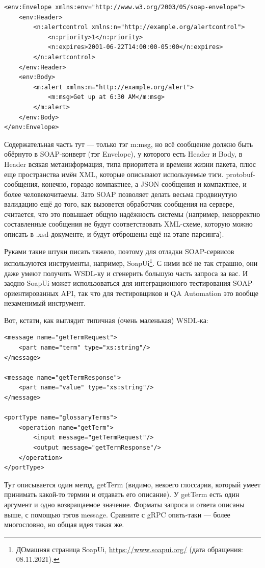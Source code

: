 \documentclass{../../text-style}
\begin{document}
\begin{verbatim}
<env:Envelope xmlns:env="http://www.w3.org/2003/05/soap-envelope">
    <env:Header>
        <n:alertcontrol xmlns:n="http://example.org/alertcontrol">
            <n:priority>1</n:priority>
            <n:expires>2001-06-22T14:00:00-05:00</n:expires>
        </n:alertcontrol>
    </env:Header>
    <env:Body>
        <m:alert xmlns:m="http://example.org/alert">
            <m:msg>Get up at 6:30 AM</m:msg>
        </m:alert>
    </env:Body>
</env:Envelope>
\end{verbatim}

Содержательная часть тут --- только тэг m:msg, но всё сообщение должно быть обёрнуто в SOAP-конверт (тэг Envelope), у которого есть Header и Body, в Header всякая метаинформация, типа приоритета и времени жизни пакета, плюс еще пространства имён XML, которые описывают используемые тэги. protobuf-сообщения, конечно, гораздо компактнее, а JSON сообщения и компактнее, и более человекочитаемы. Зато SOAP позволяет делать весьма продвинутую валидацию ещё до того, как вызовется обработчик сообщения на сервере, считается, что это повышает общую надёжность системы (например, некорректно составленные сообщения не будут соответствовать XML-схеме, которую можно описать в .xsd-документе, и будут отброшены ещё на этапе парсинга).

Руками такие штуки писать тяжело, поэтому для отладки SOAP-сервисов используются инструменты, например, SoapUi\footnote{ДОмашняя страница SoapUi, \url{https://www.soapui.org/} (дата обращения: 08.11.2021).}. С ними всё не так страшно, они даже умеют получить WSDL-ку и сгенерить большую часть запроса за вас. И заодно SoapUi может использоваться для интеграционного тестирования SOAP-ориентированных API, так что для тестировщиков и QA Automation это вообще незаменимый инструмент.

Вот, кстати, как выглядит типичная (очень маленькая) WSDL-ка:

\begin{verbatim}
<message name="getTermRequest">
    <part name="term" type="xs:string"/>
</message>

<message name="getTermResponse">
    <part name="value" type="xs:string"/>
</message>

<portType name="glossaryTerms">
    <operation name="getTerm">
        <input message="getTermRequest"/>
        <output message="getTermResponse"/>
    </operation>
</portType>
\end{verbatim}

Тут описывается один метод, getTerm (видимо, некоего глоссария, который умеет принимать какой-то термин и отдавать его описание). У getTerm есть один аргумент и одно возвращаемое значение. Форматы запроса и ответа описаны выше, с помощью тэгов message. Сравните с gRPC опять-таки --- более многословно, но общая идея такая же.
\end{document}
